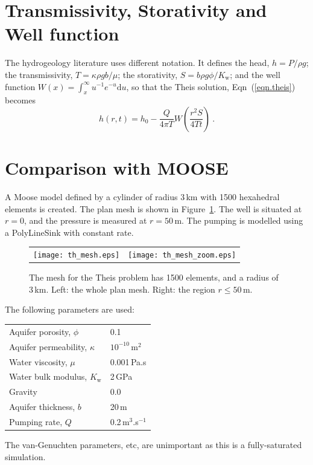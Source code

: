 \documentclass[]{scrreprt}
\begin{document}
\section{Transmissivity, Storativity and Well function}

The hydrogeology literature uses different notation.  It defines the
head, $h=P/\rho g$; the transmissivity, $T = \kappa\rho g b/\mu$; the
storativity, $S = b\rho 
g \phi/K_{\mathrm{w}}$; and the well function $W(x) =
\int_{x}^{\infty}u^{-1}e^{-u}\mathrm{d}u$, so that the Theis solution,
Eqn~(\ref{eqn.theis}) becomes
\begin{equation}
h(r,t) = h_{0} - \frac{Q}{4\pi T} W
\left(\frac{r^{2}S}{4Tt} \right) \ .
\end{equation}

\section{Comparison with MOOSE}

A Moose model defined by a cylinder of radius 3\,km with 1500
hexahedral elements is created.  The plan mesh is shown in
Figure~\ref{th.mesh.fig}.  The well is situated at $r=0$, and the
pressure is measured at $r=50$\,m.  The pumping is modelled using a
PolyLineSink with constant rate.

\begin{figure}[htb]
\begin{center}
\begin{tabular}{cc}
\texttt{[image: th\_mesh.eps]} &
\texttt{[image: th\_mesh\_zoom.eps]}
\end{tabular}
\caption{The mesh for the Theis problem has 1500 elements, and a
  radius of 3\,km.  Left: the whole plan mesh.  Right: the region
  $r\leq 50$\,m.}
\label{th.mesh.fig}
\end{center}
\end{figure}

The following parameters are used:
\begin{center}
\begin{tabular}{|ll|}
\hline
Aquifer porosity, $\phi$ & 0.1 \\
Aquifer permeability, $\kappa$ & $10^{-10}$\,m$^{2}$ \\
\hline
Water viscosity, $\mu$ & 0.001\,Pa.s \\
Water bulk modulus, $K_{\mathrm{w}}$ & 2\,GPa \\
\hline
Gravity & 0.0 \\
Aquifer thickness, $b$ & 20\,m  \\
Pumping rate, $Q$ & 0.2\,m$^{3}$.s$^{-1}$ \\
\hline
\end{tabular}
\end{center}
The van-Genuchten parameters, etc, are unimportant as this is a
fully-saturated simulation.
\end{document}

